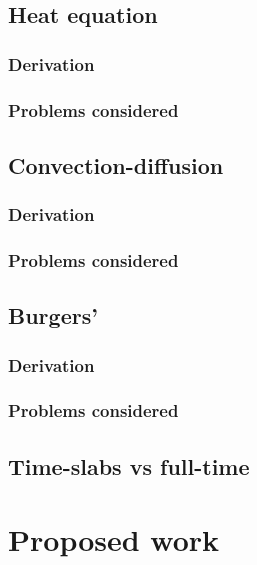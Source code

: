 \documentclass[12pt]{report}
\begin{document}
\section{Heat equation}

\subsection{Derivation}

\subsection{Problems considered}


\section{Convection-diffusion}

\subsection{Derivation}

\subsection{Problems considered}


\section{Burgers'}

\subsection{Derivation}

\subsection{Problems considered}


\section{Time-slabs vs full-time}



\chapter{Proposed work}
\end{document}
